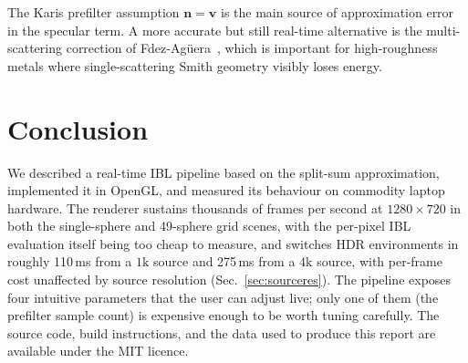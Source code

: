 \documentclass{egpubl}
\begin{document}
The Karis prefilter assumption $\mathbf{n}=\mathbf{v}$ is the main source
of approximation error in the specular term. A more accurate but still
real-time alternative is the multi-scattering correction of
Fdez-Ag{\"u}era~\cite{Fdez2019}, which is important for high-roughness
metals where single-scattering Smith geometry visibly loses energy.

\section{Conclusion}

We described a real-time IBL pipeline based on the split-sum approximation,
implemented it in OpenGL, and measured its behaviour on commodity laptop
hardware. The renderer sustains thousands of frames per second at
$1280\!\times\!720$ in both the single-sphere and 49-sphere grid scenes,
with the per-pixel IBL evaluation itself being too cheap to measure, and
switches HDR environments in roughly 110\,ms from a $1\text{k}$ source and
275\,ms from a $4\text{k}$ source, with per-frame cost unaffected by source
resolution (Sec.~\ref{sec:sourceres}). The pipeline exposes four intuitive
parameters that the user can adjust live; only one of them (the prefilter
sample count) is expensive enough to be worth tuning carefully. The source
code, build instructions, and the data used to produce this report are
available under the MIT licence.



\end{document}
